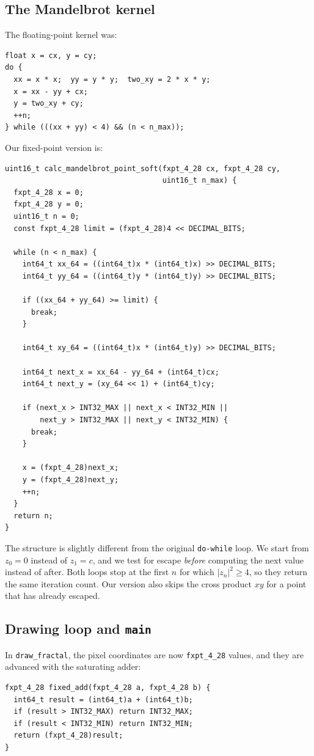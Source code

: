 \documentclass[11pt,a4paper]{article}
\begin{document}
\subsection{The Mandelbrot kernel}

The floating-point kernel was:
\begin{lstlisting}
float x = cx, y = cy;
do {
  xx = x * x;  yy = y * y;  two_xy = 2 * x * y;
  x = xx - yy + cx;
  y = two_xy + cy;
  ++n;
} while (((xx + yy) < 4) && (n < n_max));
\end{lstlisting}
Our fixed-point version is:
\begin{lstlisting}
uint16_t calc_mandelbrot_point_soft(fxpt_4_28 cx, fxpt_4_28 cy,
                                    uint16_t n_max) {
  fxpt_4_28 x = 0;
  fxpt_4_28 y = 0;
  uint16_t n = 0;
  const fxpt_4_28 limit = (fxpt_4_28)4 << DECIMAL_BITS;

  while (n < n_max) {
    int64_t xx_64 = ((int64_t)x * (int64_t)x) >> DECIMAL_BITS;
    int64_t yy_64 = ((int64_t)y * (int64_t)y) >> DECIMAL_BITS;

    if ((xx_64 + yy_64) >= limit) {
      break;
    }

    int64_t xy_64 = ((int64_t)x * (int64_t)y) >> DECIMAL_BITS;

    int64_t next_x = xx_64 - yy_64 + (int64_t)cx;
    int64_t next_y = (xy_64 << 1) + (int64_t)cy;

    if (next_x > INT32_MAX || next_x < INT32_MIN ||
        next_y > INT32_MAX || next_y < INT32_MIN) {
      break;
    }

    x = (fxpt_4_28)next_x;
    y = (fxpt_4_28)next_y;
    ++n;
  }
  return n;
}
\end{lstlisting}
The structure is slightly different from the original \texttt{do-while}
loop. We start from $z_0 = 0$ instead of $z_1 = c$, and we test for escape
\emph{before} computing the next value instead of after. Both loops stop at
the first $n$ for which $|z_n|^2 \geq 4$, so they return the same iteration
count. Our version also skips the cross product $xy$ for a point that has
already escaped.

\subsection{Drawing loop and \texttt{main}}

In \texttt{draw\_fractal}, the pixel coordinates are now
\texttt{fxpt\_4\_28} values, and they are advanced with the saturating adder:
\begin{lstlisting}
fxpt_4_28 fixed_add(fxpt_4_28 a, fxpt_4_28 b) {
  int64_t result = (int64_t)a + (int64_t)b;
  if (result > INT32_MAX) return INT32_MAX;
  if (result < INT32_MIN) return INT32_MIN;
  return (fxpt_4_28)result;
}
\end{lstlisting}
\end{document}
